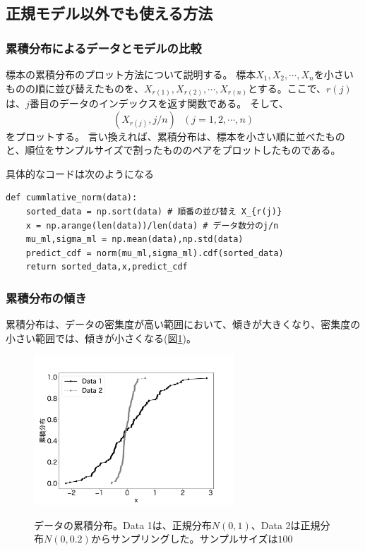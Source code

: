 





\subsection{正規モデル以外でも使える方法}
\subsubsection{累積分布によるデータとモデルの比較}

標本の累積分布のプロット方法について説明する。
標本$X_1,X_2,\cdots,X_n$を小さいものの順に並び替えたものを、$X_{r(1)},X_{r(2)},\cdots,X_{r(n)}$とする。ここで、$r(j)$は、$j$番目のデータのインデックスを返す関数である。
そして、
\begin{equation*}
    (X_{r(j)},j/n) \ \ \ (j=1,2,\cdots,n)
\end{equation*}
をプロットする。
言い換えれば、累積分布は、標本を小さい順に並べたものと、順位をサンプルサイズで割ったもののペアをプロットしたものである。

具体的なコードは次のようになる
\begin{lstlisting}
def cummlative_norm(data):
    sorted_data = np.sort(data) # 順番の並び替え X_{r(j)}
    x = np.arange(len(data))/len(data) # データ数分のj/n 
    mu_ml,sigma_ml = np.mean(data),np.std(data)
    predict_cdf = norm(mu_ml,sigma_ml).cdf(sorted_data)
    return sorted_data,x,predict_cdf
\end{lstlisting}

\subsubsection{累積分布の傾き}
累積分布は、データの密集度が高い範囲において、傾きが大きくなり、密集度の小さい範囲では、傾きが小さくなる(図\ref{fig:qq_ccummlative_data_example_normummlative})。


\begin{figure}
    \begin{center}
        \includegraphics[width=7.5cm]{./image/12_/cummlative_data_example_norm.pdf}
        \label{fig:qq_ccummlative_data_example_normummlative}
        \caption{データの累積分布。Data 1は、正規分布$N(0,1)$、Data 2は正規分布$N(0,0.2)$からサンプリングした。サンプルサイズは$100$}
    \end{center}
\end{figure}



